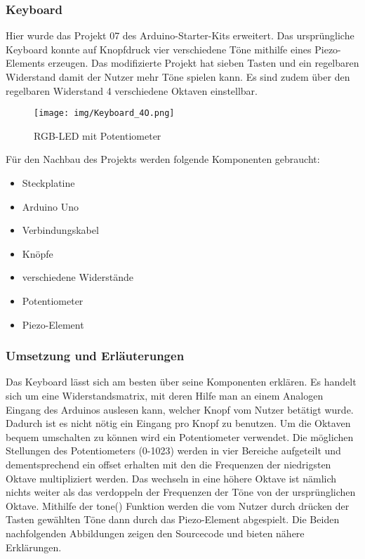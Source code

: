 \subsubsection{Keyboard}
Hier wurde das Projekt 07 des Arduino-Starter-Kits erweitert. Das ursprüngliche Keyboard konnte auf Knopfdruck vier verschiedene Töne mithilfe eines Piezo-Elements erzeugen. Das modifizierte Projekt hat sieben Tasten und ein regelbaren Widerstand
damit der Nutzer mehr Töne spielen kann. Es sind zudem über den regelbaren Widerstand 4 verschiedene Oktaven einstellbar.

\begin{figure}[h]
\begin{center}
\texttt{[image: img/Keyboard\_4O.png]}
\caption{RGB-LED mit Potentiometer}
\label{rgb_project}
\end{center}
\end{figure}

Für den Nachbau des Projekts werden folgende Komponenten gebraucht:
\begin{itemize}
\item{Steckplatine}
\item{Arduino Uno}
\item{Verbindungskabel}
\item{Knöpfe}
\item{verschiedene Widerstände}
\item{Potentiometer}
\item{Piezo-Element}
\end{itemize}

\subsubsection{Umsetzung und Erläuterungen}
Das Keyboard lässt sich am besten über seine Komponenten erklären.
Es handelt sich um eine Widerstandsmatrix, mit deren Hilfe man an einem Analogen Eingang des Arduinos auslesen kann,
welcher Knopf vom Nutzer betätigt wurde. Dadurch ist es nicht nötig ein Eingang pro Knopf zu benutzen.
Um die Oktaven bequem umschalten zu können wird ein Potentiometer verwendet. Die möglichen Stellungen des Potentiometers (0-1023) werden in vier Bereiche aufgeteilt und dementsprechend ein offset erhalten mit den die Frequenzen der niedrigsten Oktave multipliziert werden.
Das wechseln in eine höhere Oktave ist nämlich nichts weiter als das verdoppeln der Frequenzen der Töne von der ursprünglichen Oktave.
Mithilfe der tone() Funktion werden die vom Nutzer durch drücken der Tasten gewählten Töne dann durch das Piezo-Element abgespielt.
Die Beiden nachfolgenden Abbildungen zeigen den Sourcecode und bieten nähere Erklärungen.

